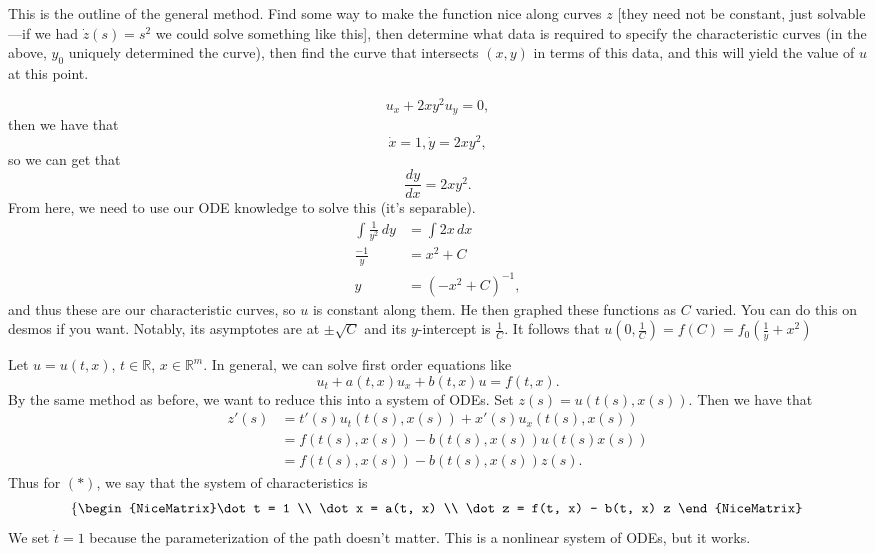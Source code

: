 This is the outline of the general method. Find some way to make the function nice along curves \( z \) [they need not be constant, just solvable---if we had \( \dot z(s) = s^{2} \) we could solve something like this], then determine what data is required to specify the characteristic curves (in the above, \( y_{0} \) uniquely determined the curve), then find the curve that intersects \( (x, y) \) in terms of this data, and this will yield the value of \( u \) at this point.

\begin{example}
	\[ u_{x} + 2xy^{2} u_{y} = 0, \]
	then we have that
	\[ \dot x = 1, \dot y = 2xy^{2}, \]
	so we can get that
	\[ \frac{dy}{dx} = 2xy^{2}. \]
	From here, we need to use our ODE knowledge to solve this (it's separable).
	\begin{align*}
		\int \frac{1}{y^{2}} \, dy &= \int 2x \, dx \\
		\frac{-1}{y} &= x^{2} + C \\
		y &= \left( - x^{2} + C \right)^{-1},
	\end{align*}
	and thus these are our characteristic curves, so \( u \) is constant along them. He then graphed these functions as \( C \) varied. You can do this on desmos if you want. Notably, its asymptotes are at \( \pm \sqrt{C} \) and its \( y \)-intercept is \( \frac{1}{C} \). 
	It follows that \( u(0, \frac{1}{C}) = f(C) = f_{0}(\frac{1}{y} + x^{2}) \)
\end{example}

\begin{remark}
	Let \( u = u(t, x) \), \( t \in \mathbb{R} \), \( x \in \mathbb{R}^{m} \). In general, we can solve first order equations like
	\[ \tag{\( * \)} u_{t} + a(t, x) u_{x} + b(t, x) u = f(t, x). \]
	By the same method as before, we want to reduce this into a system of ODEs. Set \( z(s) = u(t(s), x(s)) \). Then we have that
	\begin{align*}
		z'(s) &= t'(s) u_{t}(t(s), x(s)) + x'(s) u_{x}(t(s), x(s)) \\
		\tag{plugging into \( (*) \)}&= f(t(s), x(s)) - b(t(s), x(s)) u(t(s) x(s)) \\
					&= f(t(s), x(s)) - b(t(s), x(s)) z(s).
	\end{align*}
	Thus for \( (*) \), we say that the system of characteristics is
	\[ \left\{\begin{NiceMatrix}\dot t = 1 \\ \dot x = a(t, x) \\ \dot z = f(t, x) - b(t, x) z \end{NiceMatrix}\right. \]
	We set \( \dot t = 1 \) because the parameterization of the path doesn't matter. This is a nonlinear system of ODEs, but it works.
\end{remark}

